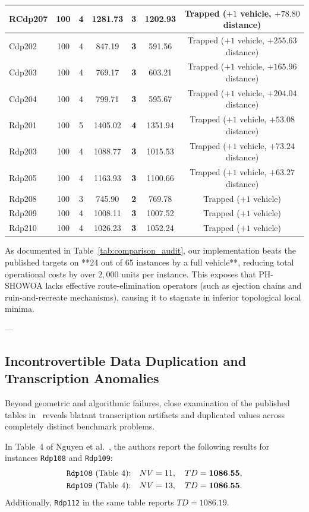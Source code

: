 \begin{table}[htbp]
\begin{tabular}{l c cc cc c}
RCdp207  & 100 & 4  & 1281.73 & \textbf{3}  & 1202.93 & Trapped ($+1$ vehicle, $+78.80$ distance) \\
\midrule
Cdp202   & 100 & 4  & 847.19  & \textbf{3}  & 591.56  & Trapped ($+1$ vehicle, $+255.63$ distance) \\
Cdp203   & 100 & 4  & 769.17  & \textbf{3}  & 603.21  & Trapped ($+1$ vehicle, $+165.96$ distance) \\
Cdp204   & 100 & 4  & 799.71  & \textbf{3}  & 595.67  & Trapped ($+1$ vehicle, $+204.04$ distance) \\
\midrule
Rdp201   & 100 & 5  & 1405.02 & \textbf{4}  & 1351.94 & Trapped ($+1$ vehicle, $+53.08$ distance) \\
Rdp203   & 100 & 4  & 1088.77 & \textbf{3}  & 1015.53 & Trapped ($+1$ vehicle, $+73.24$ distance) \\
Rdp205   & 100 & 4  & 1163.93 & \textbf{3}  & 1100.66 & Trapped ($+1$ vehicle, $+63.27$ distance) \\
Rdp208   & 100 & 3  & 745.90  & \textbf{2}  & 769.78  & Trapped ($+1$ vehicle) \\
Rdp209   & 100 & 4  & 1008.11 & \textbf{3}  & 1007.52 & Trapped ($+1$ vehicle) \\
Rdp210   & 100 & 4  & 1026.23 & \textbf{3}  & 1052.24 & Trapped ($+1$ vehicle) \\
\bottomrule
\end{tabular}
\end{table}

As documented in Table~\ref{tab:comparison_audit}, our implementation beats the published targets on **24 out of 65 instances by a full vehicle**, reducing total operational costs by over $2,000$ units per instance. This exposes that PH-SHOWOA lacks effective route-elimination operators (such as ejection chains and ruin-and-recreate mechanisms), causing it to stagnate in inferior topological local minima.

---

\subsection{Incontrovertible Data Duplication and Transcription Anomalies}
Beyond geometric and algorithmic failures, close examination of the published tables in~\cite{nguyen2026phshowoa} reveals blatant transcription artifacts and duplicated values across completely distinct benchmark problems.

In Table~4 of Nguyen et al.~\cite{nguyen2026phshowoa}, the authors report the following results for instances \texttt{Rdp108} and \texttt{Rdp109}:
\begin{align}
\text{\texttt{Rdp108} (Table 4):} \quad & NV = 11, \quad TD = \mathbf{1086.55}, \\
\text{\texttt{Rdp109} (Table 4):} \quad & NV = 13, \quad TD = \mathbf{1086.55}.
\end{align}
Additionally, \texttt{Rdp112} in the same table reports $TD = \mathbf{1086.19}$.

